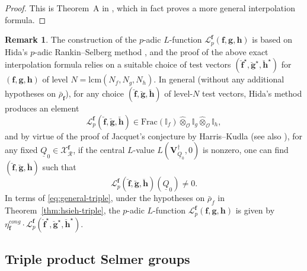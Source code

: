 \documentclass[10pt,letterpaper]{amsart}
\theoremstyle{plain}
\theoremstyle{definition}
\newtheorem{rmk}[thm]{Remark}
\theoremstyle{definition}
\theoremstyle{plain}
\theoremstyle{plain}
\theoremstyle{plain}
\theoremstyle{remark}
\numberwithin{equation}{section}
\def\cO{\mathcal O}
\newcommand{\cR}{\mathbb{I}}
\newcommand{\bfff}{{\boldsymbol{f}}}
\newcommand{\bff}{{\boldsymbol{f}}}
\newcommand{\bfg}{{\boldsymbol{g}}}
\newcommand{\bfh}{{\boldsymbol{h}}}
\begin{document}
\begin{proof}
This is Theorem~A in \cite{hsieh-triple}, which in fact proves a more general interpolation formula. 
\end{proof}


\begin{rmk}\label{rmk:harris-kudla}
The construction of the $p$-adic $L$-function
$\mathscr{L}_p^{\bff}(\bff,\bfg,\bfh)$ is based on Hida's $p$-adic Rankin--Selberg method \cite{hidaII}, and the proof of the above exact interpolation formula relies on a suitable choice of test vectors $(\breve{\bff}^\star,\breve{\bfg}^\star,\breve{\bfh}^\star)$ for  $(\bff,\bfg,\bfh)$ of level $N={\mathrm{lcm}}(N_f,N_g,N_h)$.  
In general (without any additional hypotheses on $\bar{\rho}_{\bfff}$), for any choice $(\breve{\bff},\breve{\bfg},\breve{\bfh})$ of level-$N$ test vectors, Hida's method produces an element 
\begin{equation}\label{eq:general-triple}
\mathscr{L}_p^{\bff}(\breve{\bff},\breve{\bfg},\breve{\bfh})\in{\mathrm{Frac}}(\cR_f)\hat\otimes_\cO\cR_g\hat\otimes_\cO\cR_h,
\end{equation}
and by virtue of the proof of Jacquet's conjecture by  Harris--Kudla \cite{harris-kudla} (see also \cite[Rem.~4.8]{DR1}), for any fixed $\underline{Q}_0\in\mathcal{X}_{\mathcal{R}}^\bff$, if the central $L$-value $L(\mathbf{V}_{\underline{Q}_0}^\dagger,0)$ is nonzero, one can find $(\breve{\bff},\breve{\bfg},\breve{\bfh})$ such that 
\[
\mathscr{L}_p^{\bff}(\breve{\bff},\breve{\bfg},\breve{\bfh})(\underline{Q}_0)\neq 0.
\]
In terms of \eqref{eq:general-triple}, under the hypotheses on $\bar{\rho}_f$ in Theorem~\ref{thm:hsieh-triple}, the $p$-adic $L$-function $\mathscr{L}_p^{\bff}(\bff,\bfg,\bfh)$  is given by  $\eta_\bff^{cong}\cdot\mathscr{L}_p^\bff(\breve{\bff}^\star,\breve{\bfg}^\star,\breve{\bfh}^\star)$.
\end{rmk}

\subsection{Triple product Selmer groups}
\label{subsec:tripleSelmer}
\end{document}
